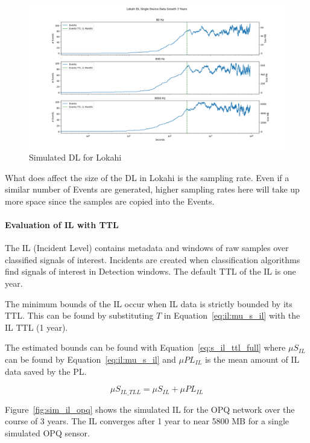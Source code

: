 \begin{figure}[H]
	\centering
	\includegraphics[width=\linewidth]{figures/sim_dl_lokahi.png}
	\caption{Simulated DL for Lokahi}
	\label{fig:sim_dl_lokahi}
\end{figure}

What does affect the size of the DL in Lokahi is the sampling rate. Even if a similar number of Events are generated, higher sampling rates here will take up more space since the samples are copied into the Events.

\paragraph{Evaluation of IL with TTL}

The IL (Incident Level) contains metadata and windows of raw samples over classified signals of interest. Incidents are created when classification algorithms find signals of interest in Detection windows. The default TTL of the IL is one year.

The minimum bounds of the IL occur when IL data is strictly bounded by its TTL. This can be found by substituting $T$ in Equation~\ref{eq:il:mu_s_il} with the IL TTL (1 year).

The estimated bounds can be found with Equation~\ref{eq:s_il_ttl_full} where $\mu S_{IL}$ can be found by Equation~\ref{eq:il:mu_s_il} and $\mu PL_{IL}$ is the mean amount of IL data saved by the PL\@.

\begin{equation}\label{eq:s_il_ttl_full}
	\mu S_{IL\_TLL} = \mu S_{IL}  + \mu PL_{IL}
\end{equation}

Figure~\ref{fig:sim_il_opq} shows the simulated IL for the OPQ network over the course of 3 years. The IL converges after 1 year to near 5800 MB for a single simulated OPQ sensor.

